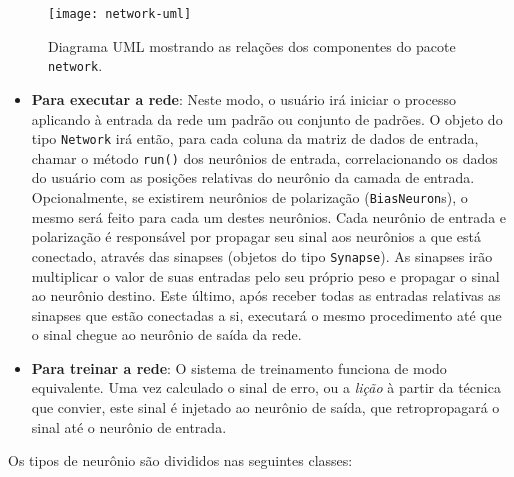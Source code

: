 \begin{figure}
\begin{center}
\texttt{[image: network-uml]}
\end{center}
\caption{Diagrama UML mostrando as relações dos componentes do pacote
\texttt{network}.}
\label{fig:network-uml}
\end{figure}

\begin{itemize}
\item \textbf{Para executar a rede}: Neste modo, o usuário irá iniciar o
processo aplicando à entrada da rede um padrão ou conjunto de padrões. O
objeto do tipo \texttt{Network} irá então, para cada coluna da matriz de dados
de entrada, chamar o método \texttt{run()} dos neurônios de entrada,
correlacionando os dados do usuário com as posições relativas do neurônio da
camada de entrada. Opcionalmente, se existirem neurônios de polarização
(\texttt{BiasNeuron}s), o mesmo será feito para cada um destes neurônios. Cada
neurônio de entrada e polarização é responsável por propagar seu sinal aos
neurônios a que está conectado, através das sinapses (objetos do tipo
\texttt{Synapse}). As sinapses irão multiplicar o valor de suas entradas pelo
seu próprio peso e propagar o sinal ao neurônio destino. Este último, após
receber todas as entradas relativas as sinapses que estão conectadas a si,
executará o mesmo procedimento até que o sinal chegue ao neurônio de saída da
rede.

\item \textbf{Para treinar a rede}: O sistema de treinamento funciona de 
modo equivalente. Uma vez calculado o sinal de erro, ou a \textit{lição} à
partir da técnica que convier, este sinal é injetado ao neurônio de saída, que
retropropagará o sinal até o neurônio de entrada.
\end{itemize}

Os tipos de neurônio são divididos nas seguintes classes:

